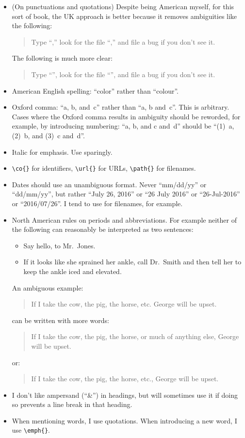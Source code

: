 \begin{itemize}
\item (On punctuations and quotations)
  Despite being American myself, for this sort of book, the UK approach
  is better because it removes ambiguities like the following:
  \begin{quote}
    Type ``,'' look for the file ``,''
    and file a bug if you don't see it.
  \end{quote}

  The following is much more clear:
  \begin{quote}
    Type ``'', look for the file ``'',
    and file a bug if you don't see it.
  \end{quote}
\item American English spelling: ``color'' rather than ``colour''.
\item Oxford comma: ``a, b, and~c'' rather than ``a, b and~c''.
  This is arbitrary.  Cases where the Oxford comma results in ambiguity
  should be reworded, for example, by introducing numbering:  ``a,
  b, and c and~d'' should be ``(1)~a, (2)~b, and (3)~c and~d''.
\item Italic for emphasis.  Use sparingly.
\item \verb|\co{}| for identifiers, \verb|\url{}| for URLs,
  \verb|\path{}| for filenames.
\item Dates should use an unambiguous format.  Never ``mm/dd/yy''
  or ``dd/mm/yy'', but rather ``July 26, 2016'' or ``26 July 2016''
  or ``26-Jul-2016'' or ``2016/07/26''.  I tend to use
   for filenames, for example.
\item North American rules on periods and abbreviations.
  For example neither of the following can reasonably be interpreted
  as two sentences:
  \begin{itemize}
  \item Say hello, to Mr.~Jones.
  \item If it looks like she sprained her ankle, call Dr.~Smith and
    then tell her to keep the ankle iced and elevated.
  \end{itemize}

  An ambiguous example:
  \begin{quote}
    If I take the cow, the pig, the horse, etc. George will be upset.
  \end{quote}
  can be written with more words:
  \begin{quote}
    If I take the cow, the pig, the horse, or much of anything else,
    George will be upset.
  \end{quote}
  or:
  \begin{quote}
    If I take the cow, the pig, the horse, etc., George will be upset.
  \end{quote}
\item I don't like ampersand (``\&'') in headings, but will sometimes
  use it if doing so prevents a line break in that heading.
\item When mentioning words, I use quotations.  When introducing
  a new word, I use \verb|\emph{}|.
\end{itemize}

